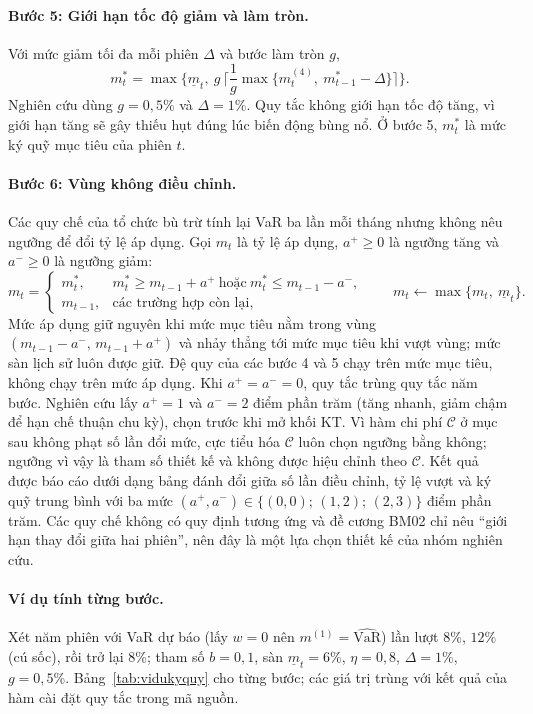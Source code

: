 \documentclass[12pt,a4paper]{article}
\theoremstyle{definition}
\theoremstyle{remark}
\newcommand{\VaR}{\mathrm{VaR}}
\newcommand{\KT}{\mathrm{KT}}
\begin{document}
\paragraph{Bước 5: Giới hạn tốc độ giảm và làm tròn.} Với mức giảm tối đa mỗi phiên $\Delta$ và bước làm tròn $g$,
\begin{equation}
m^{\ast}_t=\max\Big\{\underline m_t,\ g\,\Big\lceil\frac{1}{g}\max\big\{m^{(4)}_t,\ m^{\ast}_{t-1}-\Delta\big\}\Big\rceil\Big\}.
\end{equation}
Nghiên cứu dùng $g=0{,}5\%$ và $\Delta=1\%$. Quy tắc không giới hạn tốc độ tăng, vì giới hạn tăng sẽ gây thiếu hụt đúng lúc biến động bùng nổ. Ở bước 5, $m^{\ast}_t$ là mức ký quỹ mục tiêu của phiên $t$.

\paragraph{Bước 6: Vùng không điều chỉnh.} Các quy chế của tổ chức bù trừ tính lại VaR ba lần mỗi tháng nhưng không nêu ngưỡng để đổi tỷ lệ áp dụng. Gọi $m_t$ là tỷ lệ áp dụng, $a^{+}\ge0$ là ngưỡng tăng và $a^{-}\ge0$ là ngưỡng giảm:
\begin{equation}
m_t=\begin{cases} m^{\ast}_t, & m^{\ast}_t\ge m_{t-1}+a^{+}\ \text{hoặc}\ m^{\ast}_t\le m_{t-1}-a^{-},\\ m_{t-1}, & \text{các trường hợp còn lại,}\end{cases}\qquad m_t\leftarrow\max\{m_t,\ \underline m_t\}.
\end{equation}
Mức áp dụng giữ nguyên khi mức mục tiêu nằm trong vùng $(m_{t-1}-a^{-},\,m_{t-1}+a^{+})$ và nhảy thẳng tới mức mục tiêu khi vượt vùng; mức sàn lịch sử luôn được giữ. Đệ quy của các bước 4 và 5 chạy trên mức mục tiêu, không chạy trên mức áp dụng. Khi $a^{+}=a^{-}=0$, quy tắc trùng quy tắc năm bước. Nghiên cứu lấy $a^{+}=1$ và $a^{-}=2$ điểm phần trăm (tăng nhanh, giảm chậm để hạn chế thuận chu kỳ), chọn trước khi mở khối $\KT$. Vì hàm chi phí $\mathcal C$ ở mục sau không phạt số lần đổi mức, cực tiểu hóa $\mathcal C$ luôn chọn ngưỡng bằng không; ngưỡng vì vậy là tham số thiết kế và không được hiệu chỉnh theo $\mathcal C$. Kết quả được báo cáo dưới dạng bảng đánh đổi giữa số lần điều chỉnh, tỷ lệ vượt và ký quỹ trung bình với ba mức $(a^{+},a^{-})\in\{(0,0);\,(1,2);\,(2,3)\}$ điểm phần trăm. Các quy chế không có quy định tương ứng và đề cương BM02 chỉ nêu ``giới hạn thay đổi giữa hai phiên'', nên đây là một lựa chọn thiết kế của nhóm nghiên cứu.

\paragraph{Ví dụ tính từng bước.} Xét năm phiên với VaR dự báo (lấy $w=0$ nên $m^{(1)}=\widehat{\VaR}$) lần lượt $8\%$, $12\%$ (cú sốc), rồi trở lại $8\%$; tham số $b=0{,}1$, sàn $\underline m_t=6\%$, $\eta=0{,}8$, $\Delta=1\%$, $g=0{,}5\%$. Bảng~\ref{tab:vidukyquy} cho từng bước; các giá trị trùng với kết quả của hàm cài đặt quy tắc trong mã nguồn.
\end{document}
